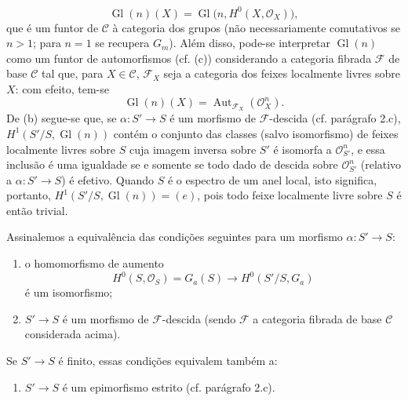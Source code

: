 \documentclass[11pt,twoside,openany]{book}
\numberwithin{equation}{section}
\newcommand{\src}[1]{%
  \phantomsection\hypertarget{src:#1}{}%
  \marginpar{\raggedleft\footnotesize\sffamily #1}%
}
\theoremstyle{plain}
\theoremstyle{definition}
\theoremstyle{remark}
\newcommand{\FgaUnitKey}{frontmatter}
\renewcommand{\src}[1]{%
  \phantomsection\hypertarget{src:\FgaUnitKey:#1}{}%
  \marginpar{\raggedleft\footnotesize\sffamily #1}%
}
\begin{document}
\src{313}
\[
  \operatorname{Gl}(n)(X)=
  \operatorname{Gl}\bigl(n,H^0(X,\mathcal O_X)\bigr),
\]
que é um funtor de $\mathcal C$ à categoria dos grupos (não
necessariamente comutativos se $n>1$; para $n=1$ se recupera $G_m$). Além disso,
pode-se interpretar $\operatorname{Gl}(n)$ como um funtor de automorfismos
(cf. (c)) considerando a categoria fibrada $\mathcal F$ de base $\mathcal C$
tal que, para $X\in\mathcal C$, $\mathcal F_X$ seja a categoria dos feixes
localmente livres sobre $X$: com efeito, tem-se
\[
  \operatorname{Gl}(n)(X)=
  \operatorname{Aut}_{\mathcal F_X}(\mathcal O_X^n).
\]
De (b) segue-se que, se $\alpha:S'\longrightarrow S$ é um morfismo de
$\mathcal F$-descida (cf. parágrafo 2.c),
$H^1(S'/S,\operatorname{Gl}(n))$ contém o conjunto das classes (salvo
isomorfismo) de feixes localmente livres sobre $S$ cuja imagem inversa sobre
$S'$ é isomorfa a $\mathcal O_{S'}^n$, e essa inclusão é uma igualdade se e
somente se todo dado de descida sobre $\mathcal O_{S'}^n$ (relativo a
$\alpha:S'\longrightarrow S$) é efetivo. Quando $S$ é o espectro de um
anel local, isto significa, portanto,
$H^1(S'/S,\operatorname{Gl}(n))=(e)$, pois todo feixe localmente livre sobre $S$
é então trivial.

Assinalemos a equivalência das condições seguintes para um morfismo
$\alpha:S'\longrightarrow S$:
\begin{enumerate}
\item[(i)] o homomorfismo de aumento
\[
  H^0(S,\mathcal O_S)=G_a(S)\longrightarrow H^0(S'/S,G_a)
\]
é um isomorfismo;
\item[(ii)] $S'\longrightarrow S$ é um morfismo de $\mathcal F$-descida
(sendo $\mathcal F$ a categoria fibrada de base $\mathcal C$ considerada
acima).
\end{enumerate}
Se $S'\longrightarrow S$ é finito, essas condições equivalem também a:
\begin{enumerate}
\item[(iii)] $S'\longrightarrow S$ é um epimorfismo estrito
(cf. parágrafo 2.c).
\end{enumerate}
\end{document}
